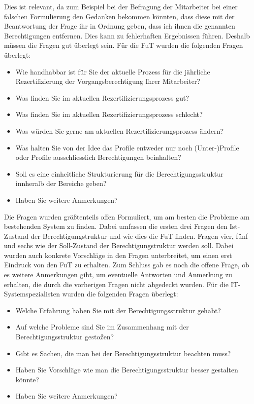 \newline
Dies ist relevant, da zum Beispiel bei der Befragung der Mitarbeiter bei einer falschen Formulierung den Gedanken bekommen könnten, dass diese mit der Beantwortung der Frage ihr in Ordnung geben, dass ich ihnen die genannten Berechtigungen entfernen.
Dies kann zu fehlerhaften Ergebnissen führen.
Deshalb müssen die Fragen gut überlegt sein.
\newline
\newline
Für die \ac{FuT} wurden die folgenden Fragen überlegt: 
\begin{itemize}
	\item Wie handhabbar ist für Sie der aktuelle Prozess für die jährliche Rezertifizierung der Vorgangsberechtigung Ihrer Mitarbeiter?
	\item Was finden Sie im aktuellen Rezertifizierungsprozess gut?
	\item Was finden Sie im aktuellen Rezertifizierungsprozess schlecht?
	\item Was würden Sie gerne am aktuellen Rezertifizierungsprozess ändern?
	\item Was halten Sie von der Idee das Profile entweder nur noch (Unter-)Profile oder Profile ausschliesslich Berechtigungen beinhalten?
	\item Soll es eine einheitliche Strukturierung für die Berechtigungsstruktur innheralb der Bereiche geben?
	\item Haben Sie weitere Anmerkungen?
\end{itemize}
Die Fragen wurden größtenteils offen Formuliert, um am besten die Probleme am bestehenden System zu finden.
Dabei umfassen die ersten drei Fragen den Ist-Zustand der Berechtigungstruktur und wie dies die \ac{FuT} finden.
Fragen vier, fünf und sechs wie der Soll-Zustand der Berechtigungstruktur werden soll.
Dabei wurden auch konkrete Vorschläge in den Fragen unterbreitet, um einen erst Eindruck von den \ac{FuT} zu erhalten.
Zum Schluss gab es noch die offene Frage, ob es weitere Anmerkungen gibt, um eventuelle Antworten und Anmerkung zu erhalten, die durch die vorherigen Fragen nicht abgedeckt wurden.
\newline
\newline
Für die IT-Systemspezialisten wurden die folgenden Fragen überlegt: 
\begin{itemize}
	\item Welche Erfahrung haben Sie mit der Berechtigungsstruktur gehabt?
	\item Auf welche Probleme sind Sie im Zusammenhang mit der Berechtigungsstruktur gestoßen?
	\item Gibt es Sachen, die man bei der Berechtigungsstruktur beachten muss?
	\item Haben Sie Vorschläge wie man die Berechtigungsstruktur besser gestalten könnte?
	\item Haben Sie weitere Anmerkungen?
\end{itemize}
